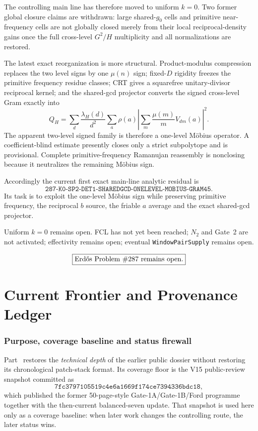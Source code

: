 \documentclass[11pt]{article}
\theoremstyle{definition}
\newcommand{\1}{\mathbf 1}
\begin{document}
The controlling main line has therefore moved to uniform $k=0$.  Two former global closure
claims are withdrawn: large shared-$g_0$ cells and primitive near-frequency cells are not
globally closed merely from their local reciprocal-density gains once the full
cross-level $G^2/H$ multiplicity and all normalizations are restored.

The latest exact reorganization is more structural.  Product-modulus compression replaces
the two level signs by one $\mu(n)$ sign; fixed-$D$ rigidity freezes the primitive
frequency residue classes; CRT gives a squarefree unitary-divisor reciprocal kernel; and
the shared-gcd projector converts the signed cross-level Gram exactly into
\[
Q_H=
\sum_d\frac{\lambda_H(d)}{d^2}
\sum_a\rho(a)
\left|
\sum_m\frac{\mu(m)}mV_{dm}(a)
\right|^2.
\]
The apparent two-level signed family is therefore a one-level M\"obius operator.  A
coefficient-blind estimate presently closes only a strict subpolytope and is provisional.
Complete primitive-frequency Ramanujan reassembly is nonclosing because it neutralizes the
remaining M\"obius sign.

Accordingly the current first exact main-line analytic residual is
\[
\boxed{
\texttt{287-K0-SP2-DET1-SHAREDGCD-ONELEVEL-MOBIUS-GRAM45}.
}
\]
Its task is to exploit the one-level M\"obius sign while preserving primitive frequency,
the reciprocal $b$ source, the friable $a$ average and the exact shared-gcd projector.

Uniform $k=0$ remains open.  FCL has not yet been reached; $N_2$ and Gate~2 are not
activated; effectivity remains open; eventual \texttt{WindowPairSupply} remains open.

\[
\boxed{\text{Erd\H{o}s Problem \#287 remains open}.}
\]

\clearpage
\part{Current Frontier and Provenance Ledger}
\label{part:technical-ledger}

\section{Purpose, coverage baseline and status firewall}
\label{sec:technical-baseline}

Part~\ref{part:technical-ledger} restores the \emph{technical depth} of the earlier public
dossier without restoring its chronological patch-stack format.  Its coverage floor is the
V15 public-review snapshot committed as
\[
\boxed{\texttt{7fc3797105519c4e6a1669f174ce7394336bdc18}},
\]
which published the former 50-page-style Gate-1A/Gate-1B/Ford programme together with the
then-current balanced-seven update.  That snapshot is used here only as a coverage baseline:
when later work changes the controlling route, the later status wins.
\end{document}
